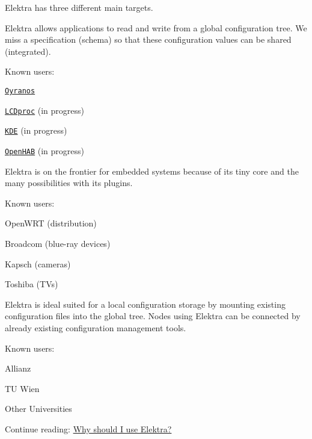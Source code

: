 Elektra has three different main targets.

Elektra allows applications to read and write from a global configuration tree. We miss a specification (schema) so that these configuration values can be shared (integrated).

Known users\+:


\begin{DoxyItemize}
\item \href{https://oyranos.org}{\tt Oyranos}
\item \href{http://lcdproc.omnipotent.net/}{\tt L\+C\+Dproc} (in progress)
\item \href{https://kde.org}{\tt K\+DE} (in progress)
\item \href{https://www.openhab.org/}{\tt Open\+H\+AB} (in progress)
\end{DoxyItemize}

Elektra is on the frontier for embedded systems because of its tiny core and the many possibilities with its plugins.

Known users\+:


\begin{DoxyItemize}
\item Open\+W\+RT (distribution)
\item Broadcom (blue-\/ray devices)
\item Kapsch (cameras)
\item Toshiba (T\+Vs)
\end{DoxyItemize}

Elektra is ideal suited for a local configuration storage by mounting existing configuration files into the global tree. Nodes using Elektra can be connected by already existing configuration management tools.

Known users\+:


\begin{DoxyItemize}
\item Allianz
\item TU Wien
\item Other Universities
\end{DoxyItemize}


\begin{DoxyItemize}
\item Continue reading\+: \hyperlink{doc_WHY_md}{Why should I use Elektra?} 
\end{DoxyItemize}